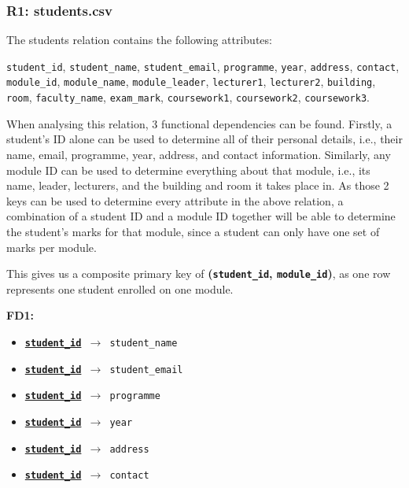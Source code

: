 \documentclass[12pt, a4paper]{report}
\begin{document}
\subsubsection*{R1: students.csv}

The students relation contains the following attributes:

\texttt{student\_id}, \texttt{student\_name}, \texttt{student\_email}, \texttt{programme}, \texttt{year}, \texttt{address}, \texttt{contact}, \texttt{module\_id}, \texttt{module\_name}, \texttt{module\_leader}, \texttt{lecturer1}, \texttt{lecturer2}, \texttt{building}, \texttt{room}, \texttt{faculty\_name}, \texttt{exam\_mark}, \texttt{coursework1}, \texttt{coursework2}, \texttt{coursework3}.

When analysing this relation, 3 functional dependencies can be found. Firstly, a student's ID alone can be used to determine all of their personal details, i.e., their name, email, programme, year, address, and contact information. Similarly, any module ID can be used to determine everything about that module, i.e., its name, leader, lecturers, and the building and room it takes place in. As those 2 keys can be used to determine every attribute in the above relation, a combination of a student ID and a module ID together will be able to determine the student's marks for that module, since a student can only have one set of marks per module.

This gives us a composite primary key of \textbf{(\texttt{student\_id}, \texttt{module\_id})}, as one row represents one student enrolled on one module.

\medskip
\noindent \textbf{FD1:} %

\begin{itemize}
    \item{\texttt{\textbf{\underline{student\_id}} $\rightarrow$ student\_name}}
    \item{\texttt{\textbf{\underline{student\_id}} $\rightarrow$ student\_email}}
    \item{\texttt{\textbf{\underline{student\_id}} $\rightarrow$ programme}}
    \item{\texttt{\textbf{\underline{student\_id}} $\rightarrow$ year}}
    \item{\texttt{\textbf{\underline{student\_id}} $\rightarrow$ address}}
    \item{\texttt{\textbf{\underline{student\_id}} $\rightarrow$ contact}}
\end{itemize}
\end{document}
